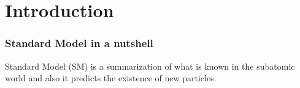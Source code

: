 \chapter{Introduction}
\label{label:intro}

\subsection{Standard Model in a nutshell}
Standard Model (SM) is a summarization of what is known in the subatomic world and also it predicts 
the existence of new particles.  

